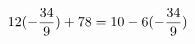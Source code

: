 \documentclass[preview]{standalone}
\begin{document}
\begin{align*}
\special{dvisvgm:raw <g id='unique000'>}12 (- \frac{34}{9}) + 78 = 10 - 6 (- \frac{34}{9})\special{dvisvgm:raw </g>}
\end{align*}
\end{document}
